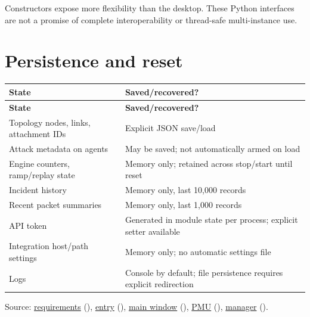 Constructors expose more flexibility than the desktop. These Python interfaces are not a promise of complete interoperability or thread-safe multi-instance use.

\section*{Persistence and reset}
\begingroup
\fontsize{8.7}{11.8}\selectfont
\setlength{\tabcolsep}{5pt}
\renewcommand{\arraystretch}{1.23}
\begin{longtable}{@{}>{\raggedright\arraybackslash}p{}>{\raggedright\arraybackslash}p{}@{}}
\rowcolor{navy} \color{white}\bfseries State & \color{white}\bfseries Saved/recovered? \\
\endfirsthead
\rowcolor{navy} \color{white}\bfseries State & \color{white}\bfseries Saved/recovered? \\
\endhead
\endfoot
\rowcolor{pale}
Topology nodes, links, attachment IDs & Explicit JSON save/load \\
Attack metadata on agents & May be saved; not automatically armed on load \\
\rowcolor{pale}
Engine counters, ramp/replay state & Memory only; retained across stop/start until reset \\
Incident history & Memory only, last 10,000 records \\
\rowcolor{pale}
Recent packet summaries & Memory only, last 1,000 records \\
API token & Generated in module state per process; explicit setter available \\
\rowcolor{pale}
Integration host/path settings & Memory only; no automatic settings file \\
Logs & Console by default; file persistence requires explicit redirection \\
\end{longtable}
\endgroup

{\footnotesize\color{muted}\raggedright Source: \href{https://github.com/neerajjayesh/GridSec-project/blob/main/requirements.txt}{requirements} (), \href{https://github.com/neerajjayesh/GridSec-project/blob/main/main.py}{entry} (), \href{https://github.com/neerajjayesh/GridSec-project/blob/main/gui/main_window.py}{main window} (), \href{https://github.com/neerajjayesh/GridSec-project/blob/main/core/pmu_simulator.py}{PMU} (), \href{https://github.com/neerajjayesh/GridSec-project/blob/main/core/integration_manager.py}{manager} ().\par}


